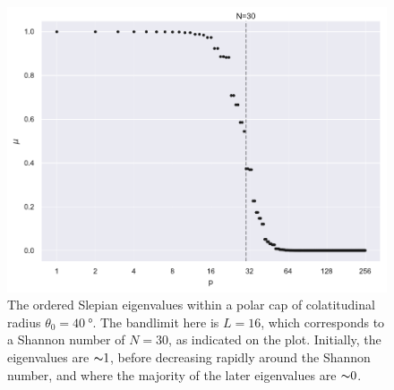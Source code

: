 \begin{figure}[htpb]
	\centering\capstart{}
	\includegraphics[width=\textwidth]{polar_cap_eigenvalues.pdf}
	\caption[
		The Slepian eigenvalues within a \(\SI{40}{\degree}\) polar cap
	]{
		The ordered Slepian eigenvalues within a polar cap of colatitudinal radius \(\theta_{0}=\SI{40}{\degree}\).
		The bandlimit here is  \(L=16\), which corresponds to a Shannon number of \(N=30\), as indicated on the plot.
		Initially, the eigenvalues are \({\thicksim}1\), before decreasing rapidly around the Shannon number, and where the majority of the later eigenvalues are \({\thicksim}0\).
	}\label{fig:chapter2_polar_cap_eigenvalues}
\end{figure}
